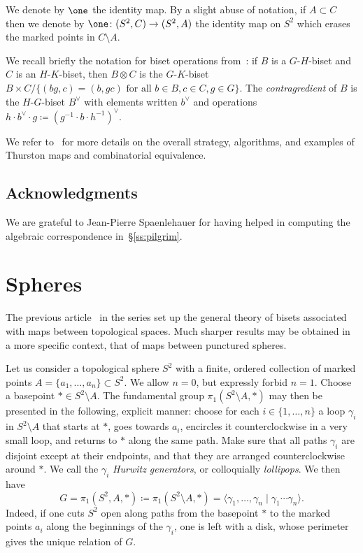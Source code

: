 \documentclass{amsart}
\begin{document}
We denote by $\one$ the identity map. By a slight abuse of notation,
if $A\subset C$ then we denote by $\one \colon (S^2,C)\to (S^2,A)$ the
identity map on $S^2$ which erases the marked points in
$C\setminus A$.

We recall briefly the notation for biset operations
from~\cite{bartholdi-dudko:bc1}: if $B$ is a $G$-$H$-biset and $C$ is
an $H$-$K$-biset, then $B\otimes C$ is the $G$-$K$-biset
$B\times C/\{(b g,c)=(b,g c)\text{ for all }b\in B,c\in C,g\in
G\}$. The \emph{contragredient} of $B$ is the $H$-$G$-biset $B^\vee$
with elements written $b^\vee$ and operations
$h\cdot b^\vee\cdot g\coloneqq (g^{-1}\cdot b\cdot h^{-1})^\vee$.

We refer to~\cite{bartholdi-dudko:bc0} for more details on the overall
strategy, algorithms, and examples of Thurston maps and combinatorial
equivalence.

\subsection{Acknowledgments}
We are grateful to Jean-Pierre Spaenlehauer for having helped in
computing the algebraic correspondence in~\S\ref{ss:pilgrim}.

\section{Spheres}
The previous article~\cite{bartholdi-dudko:bc1} in the series set up the
general theory of bisets associated with maps between topological
spaces. Much sharper results may be obtained in a more specific context,
that of maps between punctured spheres.

Let us consider a topological sphere $S^2$ with a finite, ordered
collection of marked points $A=\{a_1,\dots,a_n\}\subset S^2$. We allow
$n=0$, but expressly forbid $n=1$. Choose a basepoint $*\in
S^2\setminus A$. The fundamental group $\pi_1(S^2\setminus A ,*)$ may
then be presented in the following, explicit manner: choose for each
$i\in\{1,\dots,n\}$ a loop $\gamma_i$ in $S^2\setminus A $ that starts
at $*$, goes towards $a_i$, encircles it counterclockwise in a very
small loop, and returns to $*$ along the same path. Make sure that all
paths $\gamma_i$ are disjoint except at their endpoints, and that they
are arranged counterclockwise around $*$. We call the $\gamma_i$
\emph{Hurwitz generators}, or colloquially \emph{lollipops}. We then
have
\begin{equation}\label{eq:spheregp}
  G=\pi_1(S^2,A,*)\coloneqq \pi_1(S^2\setminus A ,*)=\langle \gamma_1,\dots,\gamma_n\mid \gamma_1\cdots\gamma_n\rangle.
\end{equation}
Indeed, if one cuts $S^2$ open along paths from the basepoint $*$ to
the marked points $a_i$ along the beginnings of the $\gamma_i$, one is
left with a disk, whose perimeter gives the unique relation of $G$.
\end{document}
